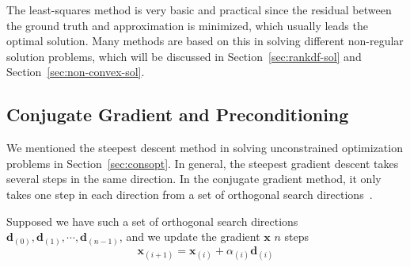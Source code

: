 \par The least-squares method is very basic and practical since the residual between the ground truth and approximation is minimized, which usually leads the optimal solution. Many methods are based on this in solving different non-regular solution problems, which will be discussed in Section~\ref{sec:rankdf-sol} and Section~\ref{sec:non-convex-sol}. 

\subsection{Conjugate Gradient and Preconditioning}
We mentioned the steepest descent method in solving unconstrained optimization problems in Section~\ref{sec:consopt}. In general, the steepest gradient descent takes several steps in the same direction. In the conjugate gradient method, it only takes one step in each direction from a set of orthogonal search directions~\citep{HM:52}.
\par Supposed we have such a set of orthogonal search directions $\mathbf{d}_{(0)}, \mathbf{d}_{(1)}, \cdots, \mathbf{d}_{(n-1)}$, and we update the gradient $\mathbf{x}$ $n$ steps
\begin{equation}
    \label{equ:update-graident}
    \mathbf{x}_{(i+1)}=\mathbf{x}_{(i)}+\alpha_{(i)} \mathbf{d}_{(i)}
\end{equation}

